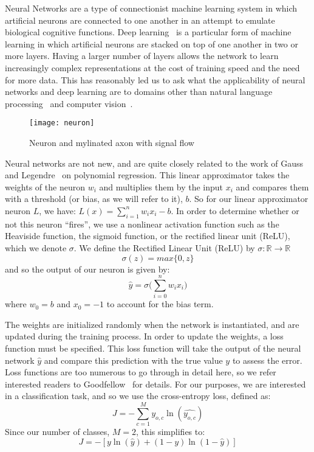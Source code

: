 \label{intro:nn}
Neural Networks are a type of connectionist machine learning system in which artificial neurons are connected to one another in an attempt to emulate biological cognitive functions.
Deep learning~\cite{goodfellow2016deep} is a particular form of machine learning in which artificial neurons are stacked on top of one another in two or more layers. 
Having a larger number of layers allows the network to learn increasingly complex representations at the cost of training speed and the need for more data. 
This has reasonably led us to ask what the applicability of neural networks and deep learning are to domains other than natural language processing~\cite{goldberg2016primer} and computer vision~\cite{lecun1998gradient}.

\begin{figure}
\caption{Neuron and mylinated axon with signal flow}
\texttt{[image: neuron]}
\centering	
\end{figure}

Neural networks are not new, and are quite closely related to the work of Gauss and Legendre~\cite{calin2020deep} on polynomial regression.
This linear approximator takes the weights of the neuron $w_i$ and multiplies them by the input $x_i$ and compares them with a threshold (or bias, as we will refer to it), $b$. 
So for our linear approximator neuron $L$, we have: $L(x) = \sum_{i=1}^{n}w_i x_i - b$.
In order to determine whether or not this neuron ``fires'', we use a nonlinear activation function such as the Heaviside function, the sigmoid function, or the rectified linear unit (ReLU), which we denote $\sigma$. 
We define the Rectified Linear Unit (ReLU) by $\sigma: \mathbb{R} \to \mathbb{R}$ 
$$\sigma(z) = max\{0, z\}$$
and so the output of our neuron is given by:
$$\hat{y} = \sigma\bigg(\sum_{i=0}^{n}w_i x_i\bigg)$$
where $w_0 = b$ and $x_0 = - 1$ to account for the bias term.

The weights are initialized randomly when the network is instantiated, and are updated during the training process.
In order to update the weights, a loss function must be specified.
This loss function will take the output of the neural network $\hat{y}$ and compare this prediction with the true value $y$ to assess the error.
Loss functions are too numerous to go through in detail here, so we refer interested readers to Goodfellow~\cite{goodfellow2016deep} for details.
For our purposes, we are interested in a classification task, and so we use the cross-entropy loss, defined as:
$$J = -\sum_{c=1}^{M} y_{o,c} \ln(\hat{y_{o,c}})$$
Since our number of classes, $M = 2$, this simplifies to:
$$J = -[y \ln(\hat{y}) + (1 - y) \ln(1 - \hat{y})]$$

